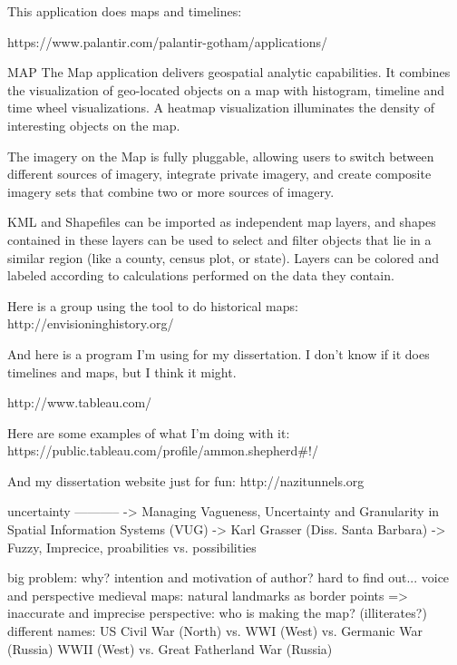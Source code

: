 This application does maps and timelines:

https://www.palantir.com/palantir-gotham/applications/

MAP
The Map application delivers geospatial analytic capabilities. It combines the visualization of geo-located objects on a map with histogram, timeline and time wheel visualizations. A heatmap visualization illuminates the density of interesting objects on the map.

The imagery on the Map is fully pluggable, allowing users to switch between different sources of imagery, integrate private imagery, and create composite imagery sets that combine two or more sources of imagery.

KML and Shapefiles can be imported as independent map layers, and shapes contained in these layers can be used to select and filter objects that lie in a similar region (like a county, census plot, or state). Layers can be colored and labeled according to calculations performed on the data they contain.


Here is a group using the tool to do historical maps: http://envisioninghistory.org/


And here is a program I’m using for my dissertation. I don’t know if it does timelines and maps, but I think it might.

http://www.tableau.com/

Here are some examples of what I’m doing with it: https://public.tableau.com/profile/ammon.shepherd#!/

And my dissertation website just for fun: http://nazitunnels.org



uncertainty
-----------
  -> Managing Vagueness, Uncertainty and Granularity in Spatial Information Systems (VUG)
  -> Karl Grasser (Diss. Santa Barbara)
  -> Fuzzy, Imprecice,
  proabilities vs. possibilities

big problem: why? intention and motivation of author? hard to find out...
voice and perspective
medieval maps: natural landmarks as border points => inaccurate and imprecise
perspective: who is making the map? (illiterates?)
different names:
  US Civil War (North) vs.
  WWI (West) vs. Germanic War (Russia)
  WWII (West) vs. Great Fatherland War (Russia)

